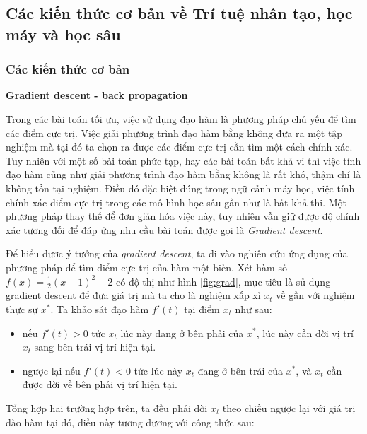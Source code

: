 \subsection{Các kiến thức cơ bản về  Trí tuệ nhân tạo, học máy và học sâu}
\subsubsection{Các kiến thức cơ bản}
\textbf{Gradient descent - back propagation}

Trong các bài toán tối ưu, việc sử dụng đạo hàm là phương pháp chủ yếu để tìm các điểm cực trị. Việc giải phương trình đạo hàm bằng không đưa ra một tập nghiệm mà tại đó ta chọn ra được các điểm cực trị cần tìm  một cách chính xác. Tuy nhiên với một số bài toán phức tạp, hay các bài toán bất khả vi thì việc tính đạo hàm cũng như giải phương trình đạo hàm bằng không là rất khó, thậm chí là không tồn tại nghiệm. Điều đó đặc biệt đúng trong ngữ cảnh máy học, việc tính chính xác điểm cực trị trong các mô hình học sâu gần như là bất khả thi. Một phương pháp thay thế  để đơn giản hóa việc này, tuy nhiên vẫn giữ được độ chính xác tương đối để đáp ứng nhu cầu bài toán được gọi là \textit{Gradient descent}.

Để  hiểu đươc ý tưởng của \textit{gradient descent}, ta đi vào nghiên cứu ứng dụng của phương pháp  để tìm điểm cực trị của hàm một biến. Xét hàm số $f(x) = \frac{1}{2}(x-1)^2 -2$ có độ thị như hình \ref{fig:grad}, mục tiêu là sử dụng gradient descent để đưa giá trị mà ta cho là nghiệm xấp xỉ $x_t$ về gần với nghiệm thực sự $x^*$. Ta khảo sát đạo hàm $f'(t)$ tại điểm $x_t$ như sau:

\begin{itemize}
    \item nếu $f'(t)>0$ tức $x_t$ lúc này đang ở bên phải của $x^*$, lúc này cần dời vị trí $x_t$ sang bên trái vị trí hiện tại.
    \item ngược lại nếu $f'(t)<0$ tức lúc này $x_t$ đang ở bên trái của $x^*$, và $x_t$ cần được dời về bên phải vị trí hiện tại.
\end{itemize}

Tổng hợp hai trường hợp trên, ta đều phải dời $x_t$ theo chiều ngược lại với giá trị đào hàm tại đó, điều này tương đương với công thức sau:

